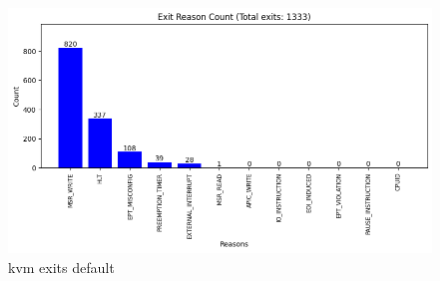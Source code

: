 \documentclass[MMR,Master,english]{twbook}
\begin{document}
\begin{figure}[H]
	\centering
	\includegraphics[width=1.0\columnwidth]{img/kvm_exit_vapic.png}
	\caption[kvm exits default]{kvm exits default}
	\label{fig:kvm_exit_vapic}
\end{figure}
\clearpage
\end{document}
